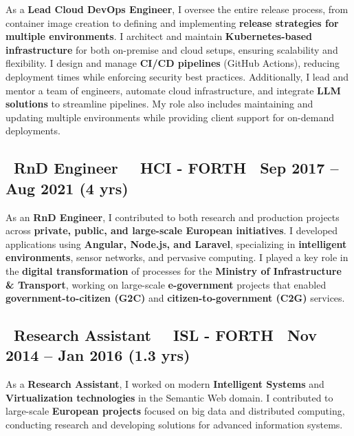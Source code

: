 \documentclass[a4paper,10pt]{article}
\begin{document}
\vspace{1pt}
\begin{adjustwidth}{1em}{1em} %
As a \textbf{Lead Cloud DevOps Engineer}, I oversee the entire release process, from container image creation to defining and implementing \textbf{release strategies for multiple environments}. I architect and maintain \textbf{Kubernetes-based infrastructure} for both on-premise and cloud setups, ensuring scalability and flexibility. I design and manage \textbf{CI/CD pipelines} (GitHub Actions), reducing deployment times while enforcing security best practices. Additionally, I lead and mentor a team of engineers, automate cloud infrastructure, and integrate \textbf{LLM solutions} to streamline pipelines. My role also includes maintaining and updating multiple environments while providing client support for on-demand deployments.
\end{adjustwidth}

\vspace{1pt}

\subsection*{\faBriefcase\ \textbf{RnD Engineer} \textbar\ \faBuilding\ HCI - FORTH  \hfill \faCalendar\ Sep 2017 – Aug 2021 (4 yrs)}
\vspace{1pt}
\begin{adjustwidth}{1em}{1em}
As an \textbf{RnD Engineer}, I contributed to both research and production projects across \textbf{private, public, and large-scale European initiatives}. I developed applications using \textbf{Angular, Node.js, and Laravel}, specializing in \textbf{intelligent environments}, sensor networks, and pervasive computing. I played a key role in the \textbf{digital transformation} of processes for the \textbf{Ministry of Infrastructure \& Transport}, working on large-scale \textbf{e-government} projects that enabled \textbf{government-to-citizen (G2C)} and \textbf{citizen-to-government (C2G)} services.
\end{adjustwidth}


\vspace{1pt}

\subsection*{\faBriefcase\ \textbf{Research Assistant} \textbar\ \faBuilding\  ISL - FORTH \hfill \faCalendar\ Nov 2014 – Jan 2016 (1.3 yrs)}
\vspace{1pt}
\begin{adjustwidth}{1em}{1em}
As a \textbf{Research Assistant}, I worked on modern \textbf{Intelligent Systems} and \textbf{Virtualization technologies} in the Semantic Web domain. I contributed to large-scale \textbf{European projects} focused on big data and distributed computing, conducting research and developing solutions for advanced information systems.
\end{adjustwidth}
\end{document}

